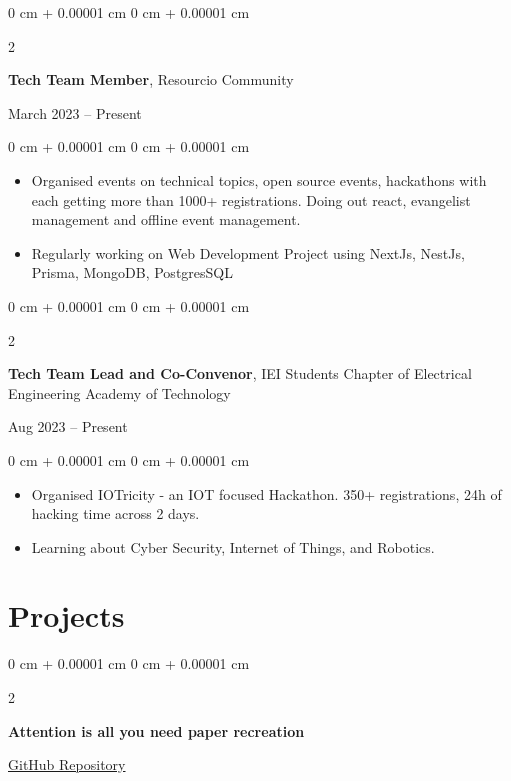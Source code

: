 \documentclass[9pt, letterpaper]{extarticle}
\newenvironment{highlights}{
    \begin{itemize}[
        topsep=0.10 cm,
        parsep=0.10 cm,
        partopsep=0pt,
        itemsep=0pt,
        leftmargin=0 cm + 10pt
    ]
}{
    \end{itemize}
} %
\newenvironment{onecolentry}{
    \begin{adjustwidth}{
        0 cm + 0.00001 cm
    }{
        0 cm + 0.00001 cm
    }
}{
    \end{adjustwidth}
} %
\newenvironment{twocolentry}[2][]{
    \onecolentry
    \def\secondColumn{#2}
    \setcolumnwidth{\fill, 4.5 cm}
    \begin{paracol}{2}
}{
    \switchcolumn \raggedleft \secondColumn
    \end{paracol}
    \endonecolentry
} %
\begin{document}
\vspace{0.2 cm}

\begin{twocolentry}{
    March 2023 – Present
}
    \textbf{Tech Team Member}, Resourcio Community
\end{twocolentry}

\vspace{0.10 cm}

\begin{onecolentry}
    \begin{highlights}
        \item Organised events on technical topics, open source events, hackathons with each getting more than 1000+ registrations. Doing out react, evangelist management and offline event management.
        \item Regularly working on Web Development Project using NextJs, NestJs, Prisma, MongoDB, PostgresSQL
    \end{highlights}
\end{onecolentry}

\vspace{0.2 cm}

\begin{twocolentry}{
    Aug 2023 – Present
}
    \textbf{Tech Team Lead and Co-Convenor}, IEI Students Chapter of Electrical Engineering Academy of Technology
\end{twocolentry}

\vspace{0.10 cm}

\begin{onecolentry}
    \begin{highlights}
        \item Organised IOTricity - an IOT focused Hackathon. 350+ registrations, 24h of hacking time across 2 days.
        \item Learning about Cyber Security, Internet of Things, and Robotics.
    \end{highlights}
\end{onecolentry}

\section{Projects}

\begin{twocolentry}{
    \href{https://github.com/debarshee2004/attention-is-all-you-need}{GitHub Repository}
}
    \textbf{Attention is all you need paper recreation}
\end{twocolentry}
\end{document}
